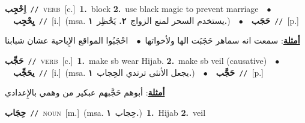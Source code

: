 \documentclass[10pt,a4paper,twoside]{article} %
\begin{document}
\begin{multicols}{2}
{{{{{{{{{{\setlength\topsep{0pt}\textbf{\foreignlanguage{arabic}{اِحْجِب}}\ {\color{gray}\texttt{//}\color{black}}\ \textsc{verb}\ [c.]\ \textbf{1.}~block  \textbf{2.}~use black magic to prevent marriage\ \ $\bullet$\ \ \setlength\topsep{0pt}\textbf{\foreignlanguage{arabic}{يِحْجِب}}\ {\color{gray}\texttt{//}\color{black}}\ [i.]\ \color{gray}(msa. \foreignlanguage{arabic}{يستخدم السحر لمنع الزواج}~\foreignlanguage{arabic}{\textbf{٢.}}  \foreignlanguage{arabic}{يَحْظِر}~\foreignlanguage{arabic}{\textbf{١.}})\color{black}\ \ $\bullet$\ \ \setlength\topsep{0pt}\textbf{\foreignlanguage{arabic}{حَجَب}}\ {\color{gray}\texttt{//}\color{black}}\ [p.]\  \begin{flushright}\color{gray}\foreignlanguage{arabic}{\textbf{\underline{\foreignlanguage{arabic}{أمثلة}}}: سمعت انه سماهر حَجَبَت الها ولأخواتها\ $\bullet$\ \  احْجَبُوا المواقع الإِباحية عشان شبابنا}\end{flushright}\color{black}} \vspace{2mm}

{\setlength\topsep{0pt}\textbf{\foreignlanguage{arabic}{حَجِّب}}\ {\color{gray}\texttt{//}\color{black}}\ \textsc{verb}\ [c.]\ \textbf{1.}~make sb wear Hijab.  \textbf{2.}~make sb veil (causative)\ \ $\bullet$\ \ \setlength\topsep{0pt}\textbf{\foreignlanguage{arabic}{يحَجِّب}}\ {\color{gray}\texttt{//}\color{black}}\ [i.]\ \color{gray}(msa. \foreignlanguage{arabic}{يجعل الأنثى ترتدي الحِجاب}~\foreignlanguage{arabic}{\textbf{١.}})\color{black}\ \ $\bullet$\ \ \setlength\topsep{0pt}\textbf{\foreignlanguage{arabic}{حَجَّب}}\ {\color{gray}\texttt{//}\color{black}}\ [p.]\  \begin{flushright}\color{gray}\foreignlanguage{arabic}{\textbf{\underline{\foreignlanguage{arabic}{أمثلة}}}: أبوهم حَجَّبهم عبكير من وهمي بالإِعدادي}\end{flushright}\color{black}} \vspace{2mm}

{\setlength\topsep{0pt}\textbf{\foreignlanguage{arabic}{حِجَاب}}\ {\color{gray}\texttt{//}\color{black}}\ \textsc{noun}\ [m.]\ \color{gray}(msa. \foreignlanguage{arabic}{حِجاب}~\foreignlanguage{arabic}{\textbf{١.}})\color{black}\ \textbf{1.}~Hijab  \textbf{2.}~veil\ 

}}}}}}}}}}
\end{multicols}
\end{document}

